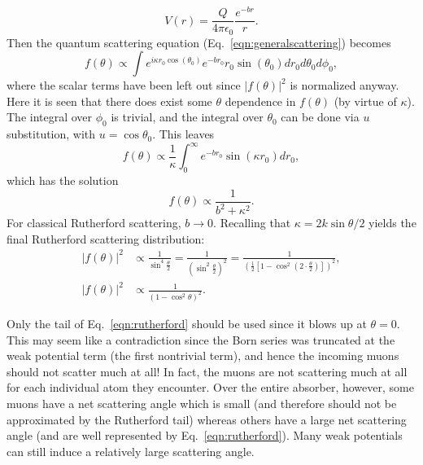 \begin{equation} \nonumber
V(r)=\frac{Q}{4\pi\epsilon_0}\frac{e^{-br}}{r}.
\end{equation}
Then the quantum scattering equation (Eq.~\eqref{eqn:generalscattering}) becomes
%
\begin{equation} \nonumber
f(\theta)\propto \int e^{i\kappa r_0\cos(\theta_0)}e^{-br_0}r_0\sin(\theta_0)dr_0 d\theta_0 d\phi_0,
\end{equation}
where the scalar terms have been left out since $|f(\theta)|^2$ is normalized anyway. Here it is seen that there does exist some $\theta$ dependence in $f(\theta)$ (by virtue of $\kappa$). The integral over $\phi_0$ is trivial, and the integral over $\theta_0$ can be done via $u$ substitution, with $u=\cos\theta_0$. This leaves
\begin{equation} \nonumber
f(\theta)\propto \frac{1}{\kappa}\int_0^\infty e^{-br_0}\sin(\kappa r_0) dr_0,
\end{equation}
%
which has the solution
\begin{equation}\nonumber
f(\theta)\propto\frac{1}{b^2+\kappa^2}.
\end{equation}
For classical Rutherford scattering, $b\rightarrow 0$. Recalling that $\kappa=2k\sin{\theta/2}$ yields the final Rutherford scattering distribution:
\begin{align}
|f(\theta)|^2 &\propto \frac{1}{\sin^4 \frac{\theta}{2}}=\frac{1}{\left(\sin^2 \frac{\theta}{2}\right)^2}=\frac{1}{\left(\frac{1}{2}\left[1-\cos^2\left(2\cdot\frac{\theta}{2}\right)\right]\right)^2},\nonumber \\
|f(\theta)|^2  &\propto\frac{1}{(1-\cos^2{\theta})^2}. \label{eqn:rutherford}
\end{align}

Only the tail of Eq.~\eqref{eqn:rutherford} should be used since it blows up at $\theta=0$. This may seem like a contradiction since the Born series was truncated at the weak potential term (the first nontrivial term), and hence the incoming muons should not scatter much at all! In fact, the muons are not scattering much at all for each individual atom they encounter. Over the entire absorber, however, some muons have a net scattering angle which is small (and therefore should not be approximated by the Rutherford tail) whereas others have a large net scattering angle (and are well represented by Eq.~\eqref{eqn:rutherford}). Many weak potentials can still induce a relatively large scattering angle.
